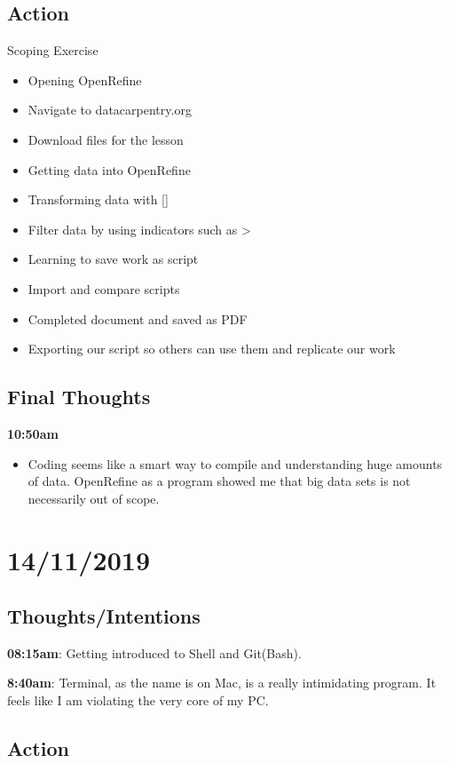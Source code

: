 \documentclass{article}
\begin{document}
\subsection{Action}

Scoping Exercise

\begin{itemize}
\item Opening OpenRefine
\item Navigate to datacarpentry.org
\item Download files for the lesson
\item Getting data into OpenRefine
\item Transforming data with []
\item Filter data by using indicators such as >
\item Learning to save work as script
\item Import and compare scripts
\item Completed document and saved as PDF
\item Exporting our script so others can use them and replicate our work
\end{itemize}


\subsection{Final Thoughts}

\textbf{10:50am}

\begin{itemize}
\item Coding seems like a smart way to compile and understanding huge amounts of data. OpenRefine as a program showed me that big data sets is not necessarily out of scope. 
\end{itemize}

\section{14/11/2019}
\subsection{Thoughts/Intentions}
\textbf{08:15am}:  Getting introduced to Shell and Git(Bash). 


\textbf{8:40am}: Terminal, as the name is on Mac, is a really intimidating program. It feels like I am violating the very core of my PC.

\subsection{Action}
\end{document}
